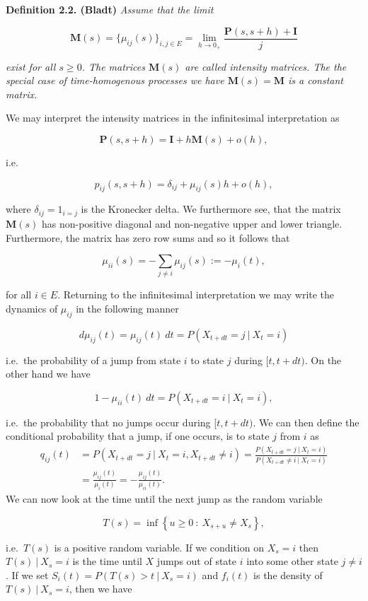 \documentclass[a4paper,10pt,openany]{book}
\begin{document}
\textbf{Definition 2.2. (Bladt)} \emph{Assume that the limit}

\[
\mathbf{M}(s)=\big\{\mu_{ij}(s)\big\}_{i,j\in E}=\lim_{h\to 0_+}\frac{\mathbf{P}(s,s+h)+\mathbf{I}}{j}
\]

\emph{exist for all \(s\ge 0\). The matrices \(\mathbf{M}(s)\) are called intensity matrices. The the special case of time-homogenous processes we have \(\mathbf{M}(s)=\mathbf{M}\) is a constant matrix. }

We may interpret the intensity matrices in the infinitesimal interpretation as

\[
\mathbf{P}(s,s+h) = \mathbf{I}+h\mathbf{M}(s)+o(h),
\]

i.e.

\[
p_{ij}(s,s+h)=\delta_{ij}+\mu_{ij}(s)h+o(h),
\]

where \(\delta_{ij}=1_{i=j}\) is the Kronecker delta. We furthermore see, that the matrix \(\mathbf{M}(s)\) has non-positive diagonal and non-negative upper and lower triangle. Furthermore, the matrix has zero row sums and so it follows that

\[
\mu_{ii}(s)=-\sum_{j\ne i}\mu_{ij}(s):=-\mu_{i}(t),
\]

for all \(i\in E\). Returning to the infinitesimal interpretation we may write the dynamics of \(\mu_{ij}\) in the following manner

\[
d\mu_{ij}(t)=\mu_{ij}(t)\ dt=P(X_{t+dt}=j\ \vert\ X_t=i)
\]

i.e.~the probability of a jump from state \(i\) to state \(j\) during \([t,t+dt)\). On the other hand we have

\[
1-\mu_{ii}(t)\ dt=P(X_{t+dt}=i\ \vert\ X_t=i),
\]

i.e.~the probability that no jumps occur during \([t,t+dt)\). We can then define the conditional probability that a jump, if one occurs, is to state \(j\) from \(i\) as
\begin{align*}
q_{ij}(t)&=P(X_{t+dt}=j\ \vert\  X_t=i,X_{t+dt}\ne i)=\frac{P(X_{t+dt}=j\ \vert\  X_t=i)}{P(X_{t+dt}\ne i\ \vert\  X_t=i)}\\
&=\frac{\mu_{ij}(t)}{\mu_i(t)}=-\frac{\mu_{ij}(t)}{\mu_{ii}(t)}.
\end{align*}
We can now look at the time until the next jump as the random variable

\[
T(s)=\inf\left\{u\ge 0\ :\ X_{s+u}\ne X_s\right\},
\]

i.e.~\(T(s)\) is a positive random variable. If we condition on \(X_s=i\) then \(T(s)\ \vert\ X_s=i\) is the time until \(X\) jumps out of state \(i\) into some other state \(j\ne i\). If we set \(S_i(t)=P(T(s)>t\ \vert\ X_s=i)\) and \(f_i(t)\) is the density of \(T(s)\ \vert\ X_s=i\), then we have
\end{document}
